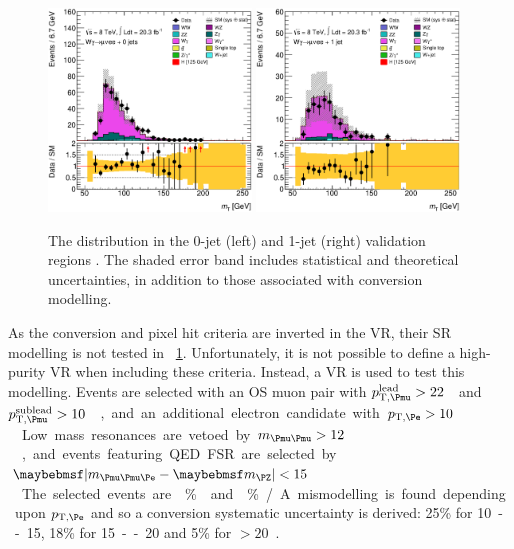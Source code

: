 \begin{figure}[t]
	\includegraphics[width=0.48\textwidth]{tex/backgrounds/Wgamma/CutTopoDPhill_0jet_MT_TrackHWW_Clj_mh125_lin}
	\hfill
	\includegraphics[width=0.48\textwidth]{tex/backgrounds/Wgamma/CutTopoDPhill_1jet_MT_TrackHWW_Clj_mh125_lin}
	\caption{The \mt distribution in the 0-jet (left) and 1-jet (right) \Wgamma validation 
	regions \cite{BackgroundNote}. The shaded error band includes statistical and 
	theoretical uncertainties, in addition to those associated with conversion modelling.}
	\label{fig:wgamma:vr}
\end{figure}

As the conversion and pixel hit criteria are inverted in the VR, their SR modelling is not 
tested in \Figure~\ref{fig:wgamma:vr}. Unfortunately, it is not possible to define a 
high-purity \Wgamma VR when including these criteria. Instead, 
a \HepProcess{\PZ \HepTo \Pmu\Pmu\Pphoton} VR is used to test this modelling. 
Events are selected with an OS muon pair with \unit{$p_{\text{T,\Pmu}}^{\text{lead}} > 
22$}{\GeV} and \unit{$p_{\text{T,\Pmu}}^{\text{sublead}} > 10$}{\GeV}, and an additional 
electron candidate with \unit{$p_{\text{T,\Pe}} > 10$}{\GeV}. Low mass resonances are vetoed 
by \unit{$m_{\HepProcess{\Pmu\Pmu}} > 12$}{\GeV}, and events featuring QED FSR are selected 
by \unit{$\mods{m_{\HepProcess{\Pmu\Pmu\Pe}} - \mZ} < 15$}{\GeV}. The selected events are 
\% \Zgamma and \% \WZ/\Zgstar. A mismodelling is found depending upon 
$p_{\text{T,\Pe}}$ and so a conversion systematic uncertainty is derived: 25\% for 
\unit{10 -- 15}{\GeV}, 18\% for \unit{15 -- 20}{\GeV} and 5\% for \unit{$>\!20$}{\GeV}.



